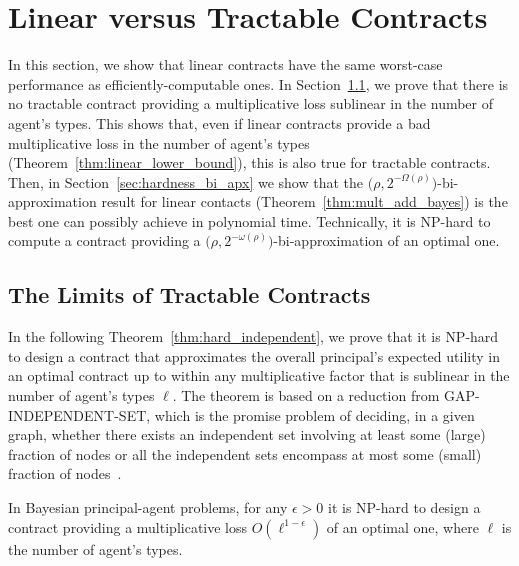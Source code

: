 \section{Linear versus Tractable Contracts}\label{sec:hardness}

In this section, we show that linear contracts have the same worst-case performance as efficiently-computable ones.
%
In Section~\ref{sec:hardness_mult}, we prove that there is no tractable contract providing a multiplicative loss sublinear in the number of agent's types.
%
This shows that, even if linear contracts provide a bad multiplicative loss in the number of agent's types (Theorem~\ref{thm:linear_lower_bound}), this is also true for tractable contracts.
%
%
Then, in Section~\ref{sec:hardness_bi_apx} we show that the $\big( \rho, 2^{-\Omega \left( \rho \right)} \big)$-bi-approximation result for linear contacts (Theorem~\ref{thm:mult_add_bayes}) is the best one can possibly achieve in polynomial time.
%
Technically, it is \textsf{NP}-hard to compute a contract providing a $\big(\rho, 2^{-\omega( \rho)}\big)$-bi-approximation of an optimal one.



\subsection{The Limits of Tractable Contracts}\label{sec:hardness_mult}

In the following Theorem~\ref{thm:hard_independent}, we prove that it is \textsf{NP}-hard to design a contract that approximates the overall principal's expected utility in an optimal contract up to within any multiplicative factor that is sublinear in the number of agent's types $\ell$.
%
The theorem is based on a reduction from GAP-INDEPENDENT-SET, which is the promise problem of deciding, in a given graph, whether there exists an independent set involving at least some (large) fraction of nodes or all the independent sets encompass at most some (small) fraction of nodes~\citep{Zuckerman2007linear}.

\begin{theorem}\label{thm:hard_independent}
	In Bayesian principal-agent problems, for any $\epsilon>0$ it is \textnormal{\textsf{NP}}-hard to design a contract providing a multiplicative loss $O \left( \ell^{1-\epsilon} \right)$ of an optimal one, where $\ell$ is the number of agent's types.
\end{theorem}

